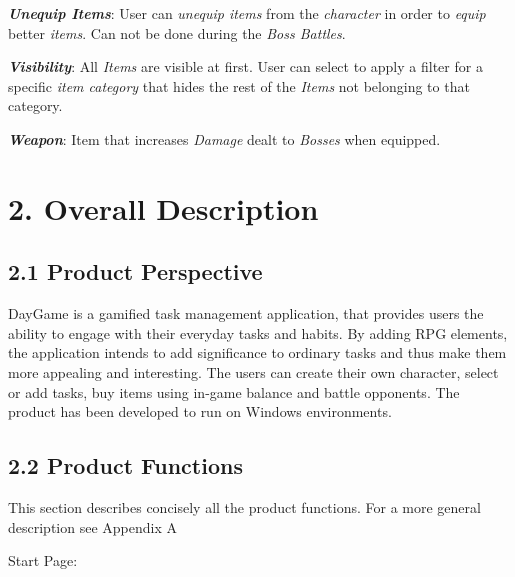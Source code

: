 \documentclass[12pt]{report}
\renewcommand{\_}{\kern-1.5pt\textunderscore\kern-1.5pt}
\begin{document}
\textbf{\textit{\textcolor[HTML]{222222}{Unequip Items}}}\textcolor[HTML]{222222}{: User can \textit{unequip items} from the \textit{character} in order to \textit{equip} better \textit{items}. Can not be done during the\textit{ Boss Battles}. }\par

\textbf{\textit{Visibility}}: All\textit{ Items} are visible at first. User can select to apply a filter for a specific \textit{item category} that hides the rest of the \textit{Items} not belonging to that category.\par

\textbf{\textit{Weapon}}: Item that increases \textit{Damage} dealt to \textit{Bosses} when equipped.\par


\vspace{\baselineskip}

\vspace{\baselineskip}
\section*{2. Overall Description}
\subsection*{2.1 Product Perspective}
DayGame is a gamified task management application, that provides users the ability to engage with their everyday tasks and habits. By adding RPG elements, the application intends to add significance to ordinary tasks and thus make them more appealing and interesting. The users can create their own character, select or add tasks, buy items using in-game balance and battle opponents. The product has been developed to run on Windows environments. \par


\vspace{\baselineskip}
\subsection*{2.2 Product Functions }
This section describes concisely all the product functions. For a more general description see Appendix A\par


\vspace{\baselineskip}
Start Page: \par
\end{document}
